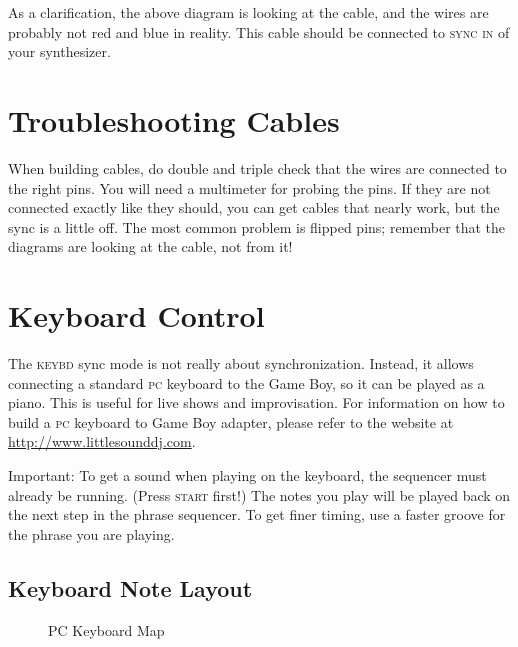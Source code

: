 As a clarification, the above diagram is looking at the cable, and the wires are probably not red and blue in reality. This cable should be connected to \textsc{sync in} of your synthesizer.

\section{Troubleshooting Cables}

When building cables, do double and triple check that the wires are connected to the right pins. You will need a multimeter for probing the pins. If they are not connected exactly like they should, you can get cables that nearly work, but the sync is a little off. The most common problem is flipped pins; remember that the diagrams are looking at the cable, not from it!

\section{Keyboard Control}

The \textsc{keybd} sync mode is not really about synchronization. Instead, it allows connecting a standard \textsc{pc} keyboard to the Game Boy, so it can be played as a piano. This is useful for live shows and improvisation. For information on how to build a \textsc{pc} keyboard to Game Boy adapter, please refer to the website at \url{http://www.littlesounddj.com}.

Important: To get a sound when playing on the keyboard, the sequencer must already be running. (Press \textsc{start} first!) The notes you play will be played back on the next step in the phrase sequencer. To get finer timing, use a faster groove for the phrase you are playing.

\subsection{Keyboard Note Layout}

\begin{figure}[htpb]
	\begin{center}
	\end{center}
	\caption{PC Keyboard Map}
	\label{fig:keybd-map}
\end{figure}

